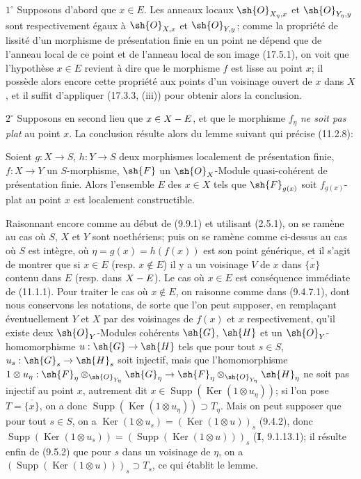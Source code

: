$1^\circ$ Supposons d'abord que $x\in E$. Les anneaux locaux $\sh{O}_{X_\eta,x}$ et $\sh{O}_{Y_\eta,y}$ sont respectivement égaux à $\sh{O}_{X,x}$ et $\sh{O}_{Y,y}$; comme la propriété de lissité d'un morphisme de présentation finie en un point ne dépend que de l'anneau local de ce point et de l'anneau local de son image (17.5.1), on voit que l'hypothèse $x\in E$ revient à dire que le morphisme $f$ est lisse au point $x$; il possède alors encore cette propriété aux points d'un voisinage ouvert de $x$ dans $X$, et il suffit d'appliquer (17.3.3, (iii)) pour obtenir alors la conclusion.

$2^\circ$ Supposons en second lieu que $x\in X- E$, et que le morphisme $f_\eta$ \emph{ne soit pas plat} au point $x$. La conclusion résulte alors du lemme suivant qui précise (11.2.8):

\begin{lemma}[17.7.11.1]
\label{IV.17.7.11.1}
Soient $g:X\to S$, $h:Y\to S$ deux morphismes localement de présentation finie, $f:X\to Y$ un $S$-morphisme, $\sh{F}$ un $\sh{O}_X$-Module quasi-cohérent de présentation finie. Alors l'ensemble $E$ des $x\in X$ tels que $\sh{F}_{g(x)}$ soit $f_{g(x)}$-plat au point $x$ est localement constructible.
\end{lemma}

Raisonnant encore comme au début de (9.9.1) et utilisant (2.5.1), on se ramène au cas où $S$, $X$ et $Y$ sont noethériens; puis on se ramène comme ci-dessus au cas où $S$ est intègre, où $\eta=g(x)=h(f(x))$ est son point générique, et il s'agit de montrer que si $x\in E$ (resp. $x\notin E$) il y a un voisinage $V$ de $x$ dans $\overline{\{x\}}$ contenu dans $E$ (resp. dans $X- E$). Le cas où $x\in E$ est conséquence immédiate de (11.1.1). Pour traiter le cas où $x\notin E$, on raisonne comme dans (9.4.7.1), dont nous conservons les notations, de sorte que l'on peut supposer, en remplaçant éventuellement $Y$ et $X$ par des voisinages de $f(x)$ et $x$ respectivement, qu'il existe deux $\sh{O}_Y$-Modules cohérents $\sh{G}$, $\sh{H}$ et un $\sh{O}_Y$-homomorphisme $u:\sh{G}\to\sh{H}$ tels que pour tout $s\in S$, $u_s:\sh{G}_s\to\sh{H}_s$ soit injectif, mais que l'homomorphisme $1\otimes u_\eta:\sh{F}_\eta\otimes_{\sh{O}_{Y_\eta}}\sh{G}_\eta\to\sh{F}_\eta\otimes_{\sh{O}_{Y_\eta}}\sh{H}_\eta$ ne soit pas injectif au point $x$, autrement dit $x\in\operatorname{Supp}(\operatorname{Ker}(1\otimes u_\eta))$; si l'on pose $T=\overline{\{x\}}$, on a donc $\operatorname{Supp}(\operatorname{Ker}(1\otimes u_\eta))\supset T_\eta$. Mais on peut supposer que pour tout $s\in S$, on a $\operatorname{Ker}(1\otimes u_s)=(\operatorname{Ker}(1\otimes u))_s$ (9.4.2), donc
$\operatorname{Supp}(\operatorname{Ker}(1\otimes u_s))=(\operatorname{Supp}(\operatorname{Ker}(1\otimes u)))_s$ (\textbf{I}, 9.1.13.1); il résulte enfin de (9.5.2) que pour $s$ dans un voisinage de $\eta$, on a $(\operatorname{Supp}(\operatorname{Ker}(1\otimes u)))_s\supset T_s$, ce qui établit le lemme.

